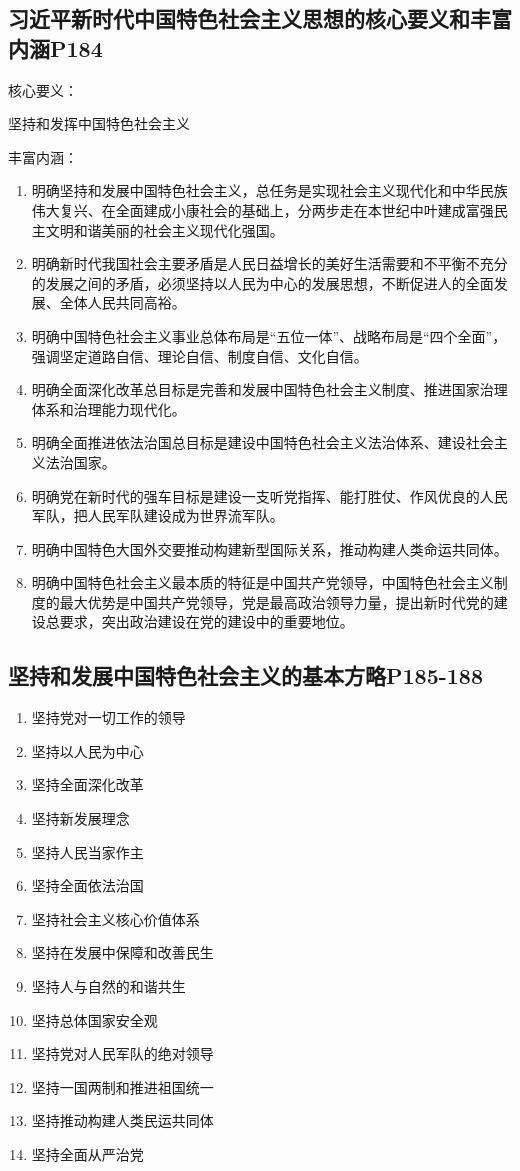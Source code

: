 \documentclass[UTF8]{ctexart}
\begin{document}
\subsection{习近平新时代中国特色社会主义思想的核心要义和丰富内涵P184}
\par 核心要义：
\par \quad 坚持和发挥中国特色社会主义
\par 丰富内涵：
\begin{enumerate}[(1)]
    \item 明确坚持和发展中国特色社会主义，总任务是实现社会主义现代化和中华民族伟大复兴、在全面建成小康社会的基础上，分两步走在本世纪中叶建成富强民主文明和谐美丽的社会主义现代化强国。
    \item 明确新时代我国社会主要矛盾是人民日益增长的美好生活需要和不平衡不充分的发展之间的矛盾，必须坚持以人民为中心的发展思想，不断促进人的全面发展、全体人民共同高裕。
    \item 明确中国特色社会主义事业总体布局是“五位一体”、战略布局是“四个全面”，强调坚定道路自信、理论自信、制度自信、文化自信。
    \item 明确全面深化改革总目标是完善和发展中国特色社会主义制度、推进国家治理体系和治理能力现代化。
    \item 明确全面推进依法治国总目标是建设中国特色社会主义法治体系、建设社会主义法治国家。
    \item 明确党在新时代的强车目标是建设一支听党指挥、能打胜仗、作风优良的人民军队，把人民军队建设成为世界流军队。
    \item 明确中国特色大国外交要推动构建新型国际关系，推动构建人类命运共同体。
    \item 明确中国特色社会主义最本质的特征是中国共产党领导，中国特色社会主义制度的最大优势是中国共产党领导，党是最高政治领导力量，提出新时代党的建设总要求，突出政治建设在党的建设中的重要地位。

\end{enumerate}
\subsection{坚持和发展中国特色社会主义的基本方略P185-188}
\begin{enumerate}[(1)]
    \item 坚持党对一切工作的领导
    \item 坚持以人民为中心
    \item 坚持全面深化改革
    \item 坚持新发展理念
    \item 坚持人民当家作主
    \item 坚持全面依法治国
    \item 坚持社会主义核心价值体系
    \item 坚持在发展中保障和改善民生
    \item 坚持人与自然的和谐共生
    \item 坚持总体国家安全观
    \item 坚持党对人民军队的绝对领导
    \item 坚持一国两制和推进祖国统一
    \item 坚持推动构建人类民运共同体
    \item 坚持全面从严治党

\end{enumerate}
\end{document}

